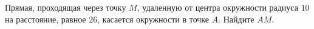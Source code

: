 \begin{ex}
	\begin{condition}
		Прямая, проходящая через точку \( M \), удаленную от центра окружности радиуса \( 10  \) на расстояние, равное \( 26 \), касается окружности в точке \( A \). Найдите \( AM \).
	\end{condition}
\end{ex}